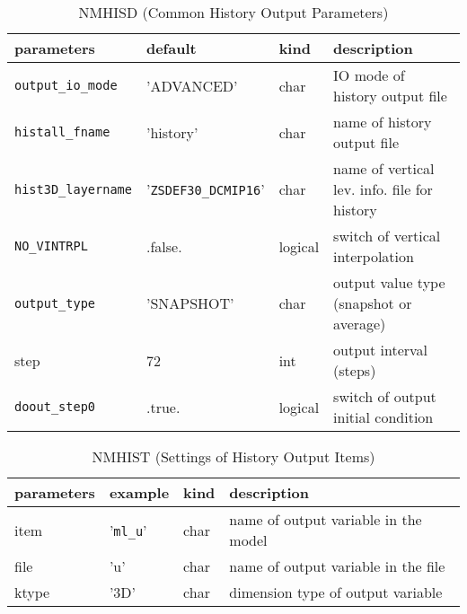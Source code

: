 \begin{table}[htb]
\begin{center}
\caption{NMHISD (Common History Output Parameters)}
\begin{tabularx}{150mm}{|l|l|l|X|} \hline
 \rowcolor[gray]{0.9} parameters & default & kind & description          \\ \hline
 \verb|output_io_mode|   & 'ADVANCED' & char    & IO mode of history output file \\ \hline
 \verb|histall_fname|    & 'history'  & char    & name of history output file \\ \hline
 \verb|hist3D_layername| & '\verb|ZSDEF30_DCMIP16|' & char & name of vertical lev. info. file for history \\ \hline
 \verb|NO_VINTRPL|       & .false.    & logical & switch of vertical interpolation \\ \hline
 \verb|output_type|      & 'SNAPSHOT' & char    & output value type (snapshot or average) \\ \hline
 step             & 72         & int     & output interval (steps) \\ \hline
 \verb|doout_step0|      & .true.     & logical & switch of output initial condition \\ \hline
\end{tabularx}
\end{center}
\end{table}

\begin{table}[t]
\begin{center}
\caption{NMHIST (Settings of History Output Items)}
\begin{tabularx}{150mm}{|l|l|l|X|} \hline
 \rowcolor[gray]{0.9} parameters & example & kind & description          \\ \hline
 item  & '\verb|ml_u|' & char & name of output variable in the model \\ \hline
 file  & 'u'    & char & name of output variable in the file \\ \hline
 ktype & '3D'   & char & dimension type of output variable \\ \hline
\end{tabularx}
\end{center}
\end{table}

